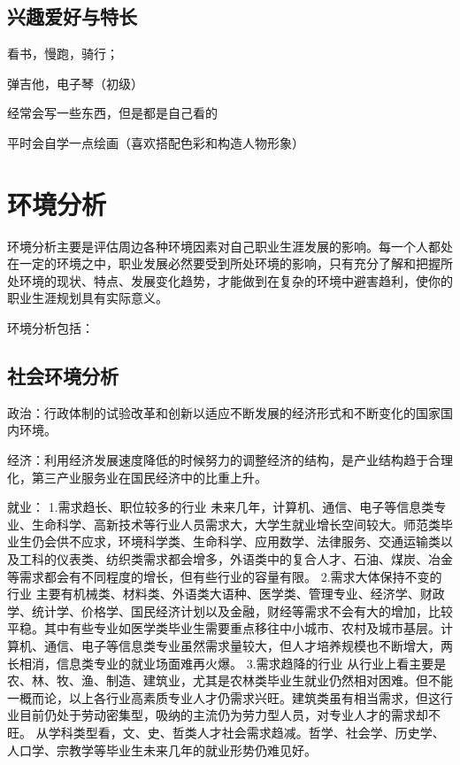 \documentclass{article}
\begin{document}
\par
\subsection{兴趣爱好与特长}
看书，慢跑，骑行；\par
弹吉他，电子琴（初级）\par
经常会写一些东西，但是都是自己看的\par
平时会自学一点绘画（喜欢搭配色彩和构造人物形象）
\par
\section{环境分析}
环境分析主要是评估周边各种环境因素对自己职业生涯发展的影响。每一个人都处在一定的环境之中，职业发展必然要受到所处环境的影响，只有充分了解和把握所处环境的现状、特点、发展变化趋势，才能做到在复杂的环境中避害趋利，使你的职业生涯规划具有实际意义。\par
环境分析包括：\par
\subsection{社会环境分析}
政治：行政体制的试验改革和创新以适应不断发展的经济形式和不断变化的国家国内环境。\par
经济：利用经济发展速度降低的时候努力的调整经济的结构，是产业结构趋于合理化，第三产业服务业在国民经济中的比重上升。\par
就业：
1.需求趋长、职位较多的行业
未来几年，计算机、通信、电子等信息类专业、生命科学、高新技术等行业人员需求大，大学生就业增长空间较大。师范类毕业生仍会供不应求，环境科学类、生命科学、应用数学、法律服务、交通运输类以及工科的仪表类、纺织类需求都会增多，外语类中的复合人才、石油、煤炭、冶金等需求都会有不同程度的增长，但有些行业的容量有限。
2.需求大体保持不变的行业
主要有机械类、材料类、外语类大语种、医学类、管理专业、经济学、财政学、统计学、价格学、国民经济计划以及金融，财经等需求不会有大的增加，比较平稳。其中有些专业如医学类毕业生需要重点移往中小城市、农村及城市基层。计算机、通信、电子等信息类专业虽然需求量较大，但人才培养规模也不断增大，两长相消，信息类专业的就业场面难再火爆。
3.需求趋降的行业
从行业上看主要是农、林、牧、渔、制造、建筑业，尤其是农林类毕业生就业仍然相对困难。但不能一概而论，以上各行业高素质专业人才仍需求兴旺。建筑类虽有相当需求，但这行业目前仍处于劳动密集型，吸纳的主流仍为劳力型人员，对专业人才的需求却不旺。
从学科类型看，文、史、哲类人才社会需求趋减。哲学、社会学、历史学、人口学、宗教学等毕业生未来几年的就业形势仍难见好。
\end{document}
